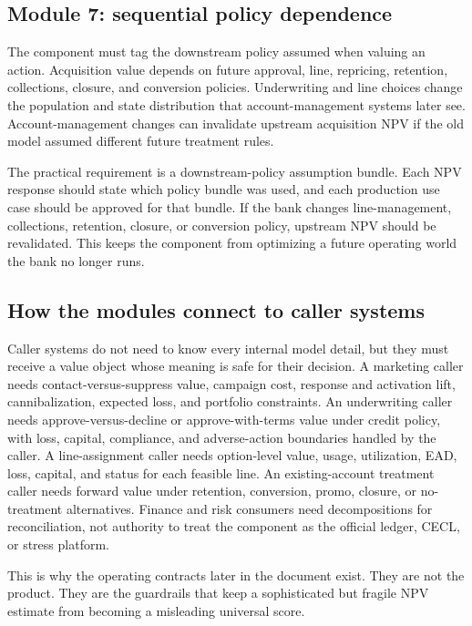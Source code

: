 \documentclass[11pt]{article}
\newcommand{\1}{\mathbf{1}}
\begin{document}
\subsection{Module 7: sequential policy dependence}
\label{subsec:module-policy}

The component must tag the downstream policy assumed when valuing an action.
Acquisition value depends on future approval, line, repricing, retention,
collections, closure, and conversion policies. Underwriting and line choices
change the population and state distribution that account-management systems
later see. Account-management changes can invalidate upstream acquisition NPV
if the old model assumed different future treatment rules.

The practical requirement is a downstream-policy assumption bundle. Each NPV
response should state which policy bundle was used, and each production use
case should be approved for that bundle. If the bank changes line-management,
collections, retention, closure, or conversion policy, upstream NPV should be
revalidated. This keeps the component from optimizing a future operating world
the bank no longer runs.

\subsection{How the modules connect to caller systems}
\label{subsec:modules-to-callers}

Caller systems do not need to know every internal model detail, but they must
receive a value object whose meaning is safe for their decision. A marketing
caller needs contact-versus-suppress value, campaign cost, response and
activation lift, cannibalization, expected loss, and portfolio constraints. An
underwriting caller needs approve-versus-decline or approve-with-terms value
under credit policy, with loss, capital, compliance, and adverse-action
boundaries handled by the caller. A line-assignment caller needs option-level
value, usage, utilization, EAD, loss, capital, and status for each feasible
line. An existing-account treatment caller needs forward value under retention,
conversion, promo, closure, or no-treatment alternatives. Finance and risk
consumers need decompositions for reconciliation, not authority to treat the
component as the official ledger, CECL, or stress platform.

This is why the operating contracts later in the document exist. They are not
the product. They are the guardrails that keep a sophisticated but fragile NPV
estimate from becoming a misleading universal score.
\end{document}
